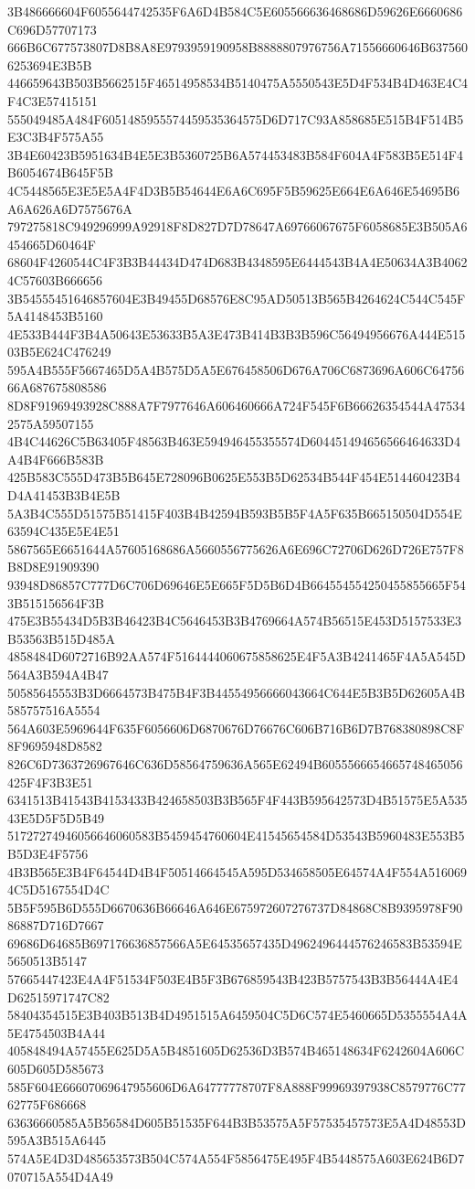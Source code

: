 {{{{{{{{{{{{{{{{{{{{{3B486666604F6055644742535F6A6D4B584C5E605566636468686D59626E6660686C696D57707173
666B6C677573807D8B8A8E9793959190958B8888807976756A71556660646B6375606253694E3B5B
446659643B503B5662515F46514958534B5140475A5550543E5D4F534B4D463E4C4F4C3E57415151
555049485A484F6051485955574459535364575D6D717C93A858685E515B4F514B5E3C3B4F575A55
3B4E60423B5951634B4E5E3B5360725B6A574453483B584F604A4F583B5E514F4B6054674B645F5B
4C5448565E3E5E5A4F4D3B5B54644E6A6C695F5B59625E664E6A646E54695B6A6A626A6D7575676A
797275818C949296999A92918F8D827D7D78647A69766067675F6058685E3B505A6454665D60464F
68604F4260544C4F3B3B44434D474D683B4348595E6444543B4A4E50634A3B40624C57603B666656
3B54555451646857604E3B49455D68576E8C95AD50513B565B4264624C544C545F5A4148453B5160
4E533B444F3B4A50643E53633B5A3E473B414B3B3B596C56494956676A444E51503B5E624C476249
595A4B555F5667465D5A4B575D5A5E676458506D676A706C6873696A606C6475666A687675808586
8D8F91969493928C888A7F7977646A606460666A724F545F6B66626354544A475342575A59507155
4B4C44626C5B63405F48563B463E594946455355574D604451494656566464633D4A4B4F666B583B
425B583C555D473B5B645E728096B0625E553B5D62534B544F454E514460423B4D4A41453B3B4E5B
5A3B4C555D51575B51415F403B4B42594B593B5B5F4A5F635B665150504D554E63594C435E5E4E51
5867565E6651644A57605168686A5660556775626A6E696C72706D626D726E757F8B8D8E91909390
93948D86857C777D6C706D69646E5E665F5D5B6D4B664554554250455855665F543B515156564F3B
475E3B55434D5B3B46423B4C5646453B3B4769664A574B56515E453D5157533E3B53563B515D485A
4858484D6072716B92AA574F5164444060675858625E4F5A3B4241465F4A5A545D564A3B594A4B47
50585645553B3D6664573B475B4F3B44554956666043664C644E5B3B5D62605A4B585757516A5554
564A603E5969644F635F6056606D6870676D76676C606B716B6D7B768380898C8F8F9695948D8582
826C6D7363726967646C636D58564759636A565E62494B6055566654665748465056425F4F3B3E51
6341513B41543B4153433B424658503B3B565F4F443B595642573D4B51575E5A53543E5D5F5D5B49
51727274946056646060583B5459454760604E41545654584D53543B5960483E553B5B5D3E4F5756
4B3B565E3B4F64544D4B4F50514664545A595D534658505E64574A4F554A5160694C5D5167554D4C
5B5F595B6D555D6670636B66646A646E675972607276737D84868C8B9395978F9086887D716D7667
69686D64685B697176636857566A5E64535657435D4962496444576246583B53594E5650513B5147
57665447423E4A4F51534F503E4B5F3B676859543B423B5757543B3B56444A4E4D62515971747C82
58404354515E3B403B513B4D4951515A6459504C5D6C574E5460665D5355554A4A5E4754503B4A44
405848494A57455E625D5A5B4851605D62536D3B574B465148634F6242604A606C605D605D585673
585F604E66607069647955606D6A64777778707F8A888F99969397938C8579776C7762775F686668
63636660585A5B56584D605B51535F644B3B53575A5F57535457573E5A4D48553D595A3B515A6445
574A5E4D3D485653573B504C574A554F5856475E495F4B5448575A603E624B6D7070715A554D4A49
}}}}}}}}}}}}}}}}}}}}}
